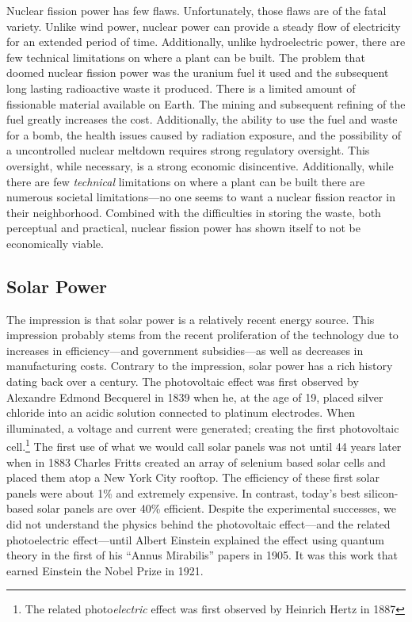 Nuclear fission power has few flaws. Unfortunately, those flaws are of the fatal variety. Unlike wind power, nuclear power can provide a steady flow of electricity for an extended period of time. Additionally, unlike hydroelectric power, there are few technical limitations on where a plant can be built. The problem that doomed nuclear fission power was the uranium fuel it used and the subsequent long lasting radioactive waste it produced. There is a limited amount of fissionable material available on Earth. The mining and subsequent refining of the fuel greatly increases the cost. Additionally, the ability to use the fuel and waste for a bomb, the health issues caused by radiation exposure, and the possibility of a uncontrolled nuclear meltdown requires strong regulatory oversight. This oversight, while necessary, is a strong economic disincentive. Additionally, while there are few \textit{technical} limitations on where a plant can be built there are numerous societal limitations---no one seems to want a nuclear fission reactor in their neighborhood. Combined with the difficulties in storing the waste, both perceptual and practical, nuclear fission power has shown itself to not be economically viable.

\subsection{Solar Power}
The impression is that solar power is a relatively recent energy source. This impression probably stems from the recent proliferation of the technology due to increases in efficiency---and government subsidies---as well as decreases in manufacturing costs. Contrary to the impression, solar power has a rich history dating back over a century. The photovoltaic effect was first observed by Alexandre Edmond Becquerel in 1839 when he, at the age of 19, placed silver chloride into an acidic solution connected to platinum electrodes. When illuminated, a voltage and current were generated; creating the first photovoltaic cell.\footnote{The related photo\textit{electric} effect was first observed by Heinrich Hertz in 1887} The first use of what we would call solar panels was not until 44 years later when in 1883 Charles Fritts created an array of selenium based solar cells and placed them atop a New York City rooftop\cite{historyofenergy}. The efficiency of these first solar panels were about 1\% and extremely expensive. In contrast, today's best silicon-based solar panels are over 40\% efficient. Despite the experimental successes, we did not understand the physics behind the photovoltaic effect---and the related photoelectric effect---until Albert Einstein explained the effect using quantum theory in the first of his ``Annus Mirabilis'' papers in 1905. It was this work that earned Einstein the Nobel Prize in 1921.

